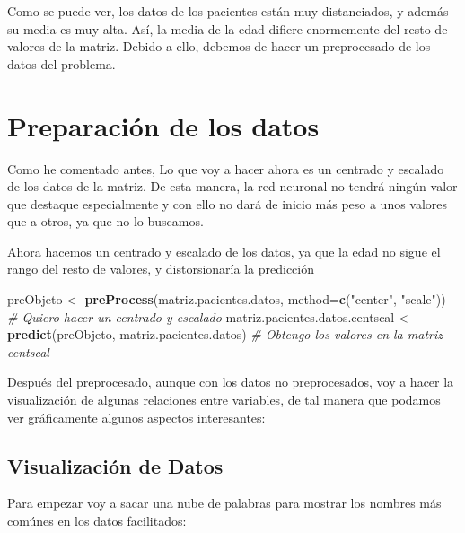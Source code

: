 \documentclass[]{article}
\newenvironment{Shaded}{\begin{snugshade}}{\end{snugshade}}
\newcommand{\KeywordTok}[1]{\textcolor[rgb]{0.13,0.29,0.53}{\textbf{#1}}}
\newcommand{\DataTypeTok}[1]{\textcolor[rgb]{0.13,0.29,0.53}{#1}}
\newcommand{\StringTok}[1]{\textcolor[rgb]{0.31,0.60,0.02}{#1}}
\newcommand{\CommentTok}[1]{\textcolor[rgb]{0.56,0.35,0.01}{\textit{#1}}}
\newcommand{\OtherTok}[1]{\textcolor[rgb]{0.56,0.35,0.01}{#1}}
\newcommand{\OperatorTok}[1]{\textcolor[rgb]{0.81,0.36,0.00}{\textbf{#1}}}
\newcommand{\NormalTok}[1]{#1}
\begin{document}
Como se puede ver, los datos de los pacientes están muy distanciados, y
además su media es muy alta. Así, la media de la edad difiere
enormemente del resto de valores de la matriz. Debido a ello, debemos de
hacer un preprocesado de los datos del problema.

\section{Preparación de los datos}\label{preparacion-de-los-datos}

Como he comentado antes, Lo que voy a hacer ahora es un centrado y
escalado de los datos de la matriz. De esta manera, la red neuronal no
tendrá ningún valor que destaque especialmente y con ello no dará de
inicio más peso a unos valores que a otros, ya que no lo buscamos.

Ahora hacemos un centrado y escalado de los datos, ya que la edad no
sigue el rango del resto de valores, y distorsionaría la predicción

\begin{Shaded}
\begin{Highlighting}[]
\NormalTok{preObjeto <-}\StringTok{ }\KeywordTok{preProcess}\NormalTok{(matriz.pacientes.datos, }\DataTypeTok{method=}\KeywordTok{c}\NormalTok{(}\StringTok{"center"}\NormalTok{, }\StringTok{"scale"}\NormalTok{))  }\CommentTok{# Quiero hacer un centrado y escalado}
\NormalTok{matriz.pacientes.datos.centscal <-}\StringTok{ }\KeywordTok{predict}\NormalTok{(preObjeto, matriz.pacientes.datos) }\CommentTok{# Obtengo los valores en la matriz centscal}
\end{Highlighting}
\end{Shaded}

Después del preprocesado, aunque con los datos no preprocesados, voy a
hacer la visualización de algunas relaciones entre variables, de tal
manera que podamos ver gráficamente algunos aspectos interesantes:

\subsection{Visualización de Datos}\label{visualizacion-de-datos}

Para empezar voy a sacar una nube de palabras para mostrar los nombres
más comúnes en los datos facilitados:

\begin{Shaded}
\end{Shaded}
\end{document}
